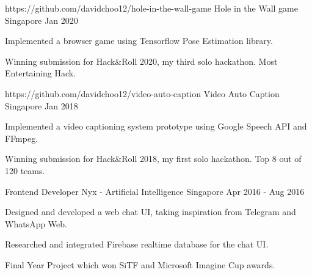 

\begin{cventries}

  \cventry
    {https://github.com/davidchoo12/hole-in-the-wall-game} %
    {Hole in the Wall game} %
    {Singapore} %
    {Jan 2020} %
    {
      \begin{cvitems} %
        \item {Implemented a browser game using Tensorflow Pose Estimation library.}
        \item {Winning submission for Hack\&Roll 2020, my third solo hackathon. Most Entertaining Hack.}
      \end{cvitems}
    }

  \cventry
    {https://github.com/davidchoo12/video-auto-caption} %
    {Video Auto Caption} %
    {Singapore} %
    {Jan 2018} %
    {
      \begin{cvitems} %
        \item {Implemented a video captioning system prototype using Google Speech API and FFmpeg.}
        \item {Winning submission for Hack\&Roll 2018, my first solo hackathon. Top 8 out of 120 teams.}
      \end{cvitems}
    }

  \cventry
    {Frontend Developer} %
    {Nyx - Artificial Intelligence} %
    {Singapore} %
    {Apr 2016 - Aug 2016} %
    {
      \begin{cvitems} %
        \item {Designed and developed a web chat UI, taking inspiration from Telegram and WhatsApp Web.}
        \item {Researched and integrated Firebase realtime database for the chat UI.}
        \item {Final Year Project which won SiTF and Microsoft Imagine Cup awards.}
      \end{cvitems}
    }

\end{cventries}
